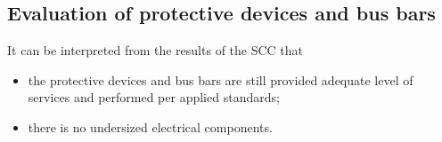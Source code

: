 \subsection{Evaluation of protective devices and bus bars}
It can be interpreted from the results of the SCC that 
\begin{itemize}
\item the protective devices and bus bars are still provided adequate level of services and performed per applied standards;

\item there is no undersized electrical components.
\end{itemize}





